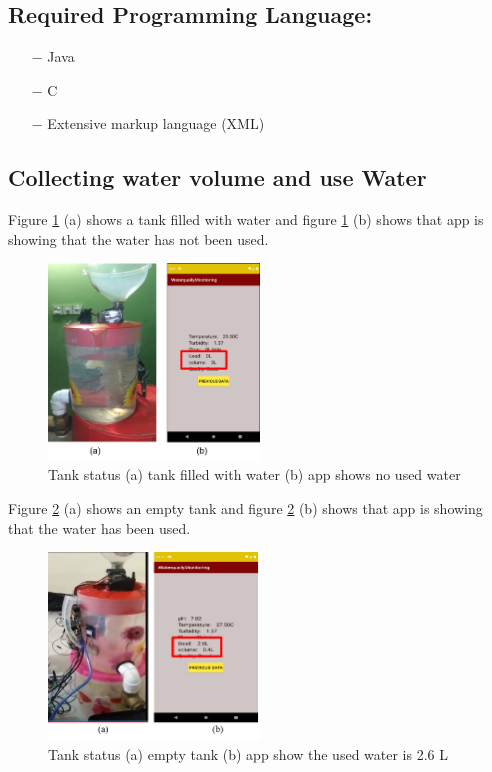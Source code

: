 \subsection{Required Programming Language:}
\begin{itemize}
    \item[$-$] Java
    \item[$-$] C
    \item[$-$] Extensive markup language (XML)
\end{itemize}

\subsection{Collecting water volume and use Water}
Figure \ref{filledTank} (a) shows a tank filled with water and figure \ref{filledTank} (b) shows that app is showing that the water has not been used.
\begin{figure}[H]
\centering
\includegraphics[width=0.5\textwidth]{figures/filledTank.png}
\caption{Tank status (a) tank filled with water (b) app shows no used water}
\label{filledTank}
\end{figure}
Figure \ref{emptyTank} (a) shows an empty tank and figure \ref{emptyTank} (b) shows that app is showing that the water has been used.
\begin{figure}[H]
\centering
\includegraphics[width=0.5\textwidth]{figures/EmptyTank.png}
\caption{Tank status (a) empty tank (b) app show the used water is 2.6 L}
\label{emptyTank}
\end{figure}
